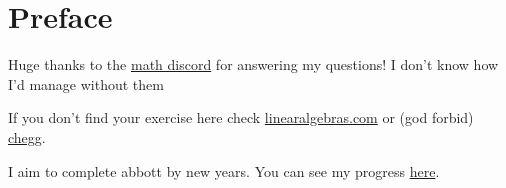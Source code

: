 \documentclass[titlepage,12pt]{book}
\begin{document}
\maketitle
\frontmatter

\chapter*{Preface}
Huge thanks to the \href{https://discord.com/invite/math}{math discord} for answering my questions! I don't know how I'd manage without them \heart
\par

If you don't find your exercise here check \href{https://linearalgebras.com/solution-understanding-analysis.html}{linearalgebras.com} or (god forbid) \href{https://www.chegg.com/homework-help/understanding-analysis-2nd-edition-solutions-9781493927111}{chegg}.
\par
I aim to complete abbott by new years. You can see my progress \href{https://www.beeminder.com/valvate/abbott-exercises}{here}.

\tableofcontents
\mainmatter




\end{document}
